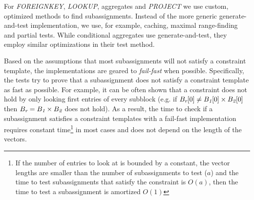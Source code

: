For \textit{FOREIGNKEY}, \textit{LOOKUP}, aggregates and \textit{PROJECT} we use custom, optimized methods to find subassignments.
Instead of the more generic generate-and-test implementation, we use, for example, caching, maximal range-finding and partial tests.
While conditional aggregates use generate-and-test, they employ similar optimizations in their test method.

Based on the assumptions that most subassignments will not satisfy a constraint template, the implementations are geared to \textit{fail-fast} when possible.
Specifically, the tests try to prove that a subassignment does not satisfy a constraint template as fast as possible.
For example, it can be often shown that a constraint does not hold by only looking first entries of every subblock (e.g. if $B_{\textit{r}}[0] \neq B_{\textit{1}}[0] \times B_{\textit{2}}[0]$ then $B_{\textit{r}} = B_{\textit{1}} \times B_{\textit{2}}$ does not hold).
As a result, the time to check if a subassignment satisfies a constraint templates with a fail-fast implementation requires constant time\footnote{If the number of entries to look at is bounded by a constant, the vector lengths are smaller than the number of subassignments to test ($a$) and the time to test subassignments that satisfy the constraint is $O(a)$, then the time to test a subassignment is amortized $O(1)$} in most cases and does not depend on the length of the vectors.





